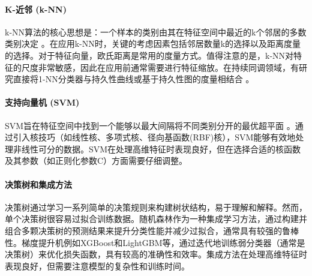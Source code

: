 \paragraph*{K-近邻 (k-NN)}
k-NN算法的核心思想是：一个样本的类别由其在特征空间中最近的k个邻居的多数类别决定 。在应用k-NN时，关键的考虑因素包括邻居数量k的选择以及距离度量的选择。对于特征向量，欧氏距离是常用的度量方式。值得注意的是，k-NN对特征的尺度非常敏感，因此在应用前通常需要进行特征缩放。在持续同调领域，有研究直接将1-NN分类器与持久性曲线或基于持久性图的度量相结合 。\cite{susto2018time}

\paragraph*{支持向量机 (SVM)}
SVM旨在特征空间中找到一个能够以最大间隔将不同类别分开的最优超平面 。通过引入核技巧（如线性核、多项式核、径向基函数(RBF)核），SVM能够有效地处理非线性可分的数据。SVM在处理高维特征时表现良好，但在选择合适的核函数及其参数（如正则化参数C）方面需要仔细调整。
\cite{de2023persistent}

\paragraph*{决策树和集成方法}
决策树通过学习一系列简单的决策规则来构建树状结构，易于理解和解释。然而，单个决策树很容易过拟合训练数据。随机森林作为一种集成学习方法，通过构建并组合多颗决策树的预测结果来提升分类性能并减少过拟合，通常具有较强的鲁棒性。梯度提升机例如XGBoost和LightGBM等，通过迭代地训练弱分类器（通常是决策树）来优化损失函数，具有较高的准确性和效率。集成方法在处理高维特征时表现良好，但需要注意模型的复杂性和训练时间。

